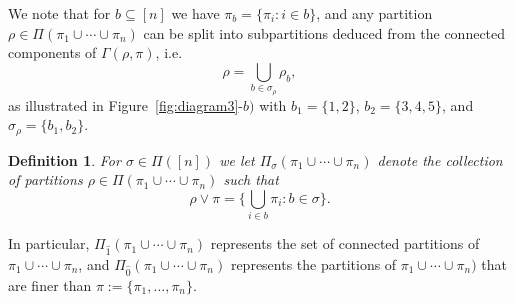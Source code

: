 \documentclass[12pt]{article}
\newtheorem{definition}[prop]{Definition}
\numberwithin{equation}{section}
\begin{document}
\vspace{-0.3cm}

\noindent 
 We note that for $b\subseteq[n]$ we have $\pi_b=\{\pi_i:i\in b\}$, 
 and any partition $\rho \in \Pi ( \pi_1\cup \cdots \cup \pi_n )$ 
 can be split into subpartitions deduced
 from the connected components of $\Gamma(\rho,\pi)$, i.e. 
 \begin{equation}
\nonumber %
   \rho=\bigcup_{b\in\sigma_\rho}\rho_b, 
\end{equation} 
 as illustrated in Figure~\ref{fig:diagram3}-$b)$ with
 $b_1 = \{ 1,2\}$, $b_2 = \{3,4,5\}$,
 and $\sigma_\rho = \{ b_1,b_2\}$. 
\begin{definition}
 For $\sigma\in\Pi([n])$ 
 we let $\Pi_{\sigma}(\pi_1\cup \cdots \cup \pi_n )$ 
 denote the collection of partitions
$\rho\in\Pi(\pi_1\cup \cdots \cup \pi_n)$ such that
$$\rho\vee\pi=\bigg\{\bigcup_{i\in b}\pi_i:b\in\sigma\bigg\}.
$$
\end{definition} 
In particular,
$\Pi_{\widehat{1}}(\pi_1\cup \cdots \cup \pi_n )$
represents the
set of connected partitions of 
$\pi_1\cup \cdots \cup \pi_n $,
and
$\Pi_{\widehat{0}}(\pi_1\cup \cdots \cup \pi_n )$
represents the partitions of 
$\pi_1\cup \cdots \cup \pi_n )$
that are finer than
$\pi := \{ \pi_1,\ldots , \pi_n \}$.

\medskip
 
\end{document}
